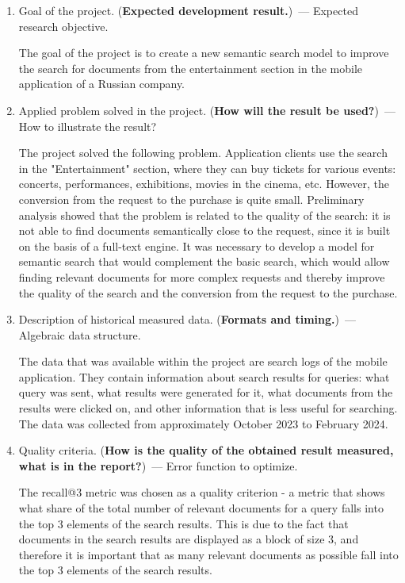 \documentclass[12pt]{article}
\begin{document}
\begin{enumerate}
\item Goal of the project. (\textbf{Expected development result.})~---
Expected research objective.  

The goal of the project is to create a new semantic search model to improve the search for documents from the entertainment section in the mobile application of a Russian company.  

\item Applied problem solved in the project. (\textbf{How will the result be used?})~--- How to illustrate the result?  

The project solved the following problem. Application clients use the search in the "Entertainment" section, where they can buy tickets for various events: concerts, performances, exhibitions, movies in the cinema, etc. However, the conversion from the request to the purchase is quite small. Preliminary analysis showed that the problem is related to the quality of the search: it is not able to find documents semantically close to the request, since it is built on the basis of a full-text engine. It was necessary to develop a model for semantic search that would complement the basic search, which would allow finding relevant documents for more complex requests and thereby improve the quality of the search and the conversion from the request to the purchase.  

\item Description of historical measured data. (\textbf{Formats and timing.})~--- Algebraic data structure.  

The data that was available within the project are search logs of the mobile application. They contain information about search results for queries: what query was sent, what results were generated for it, what documents from the results were clicked on, and other information that is less useful for searching. The data was collected from approximately October 2023 to February 2024.

\item Quality criteria. (\textbf{How is the quality of the obtained result measured, what is in the report?})~--- Error function to optimize.  

The recall@3 metric was chosen as a quality criterion - a metric that shows what share of the total number of relevant documents for a query falls into the top 3 elements of the search results. This is due to the fact that documents in the search results are displayed as a block of size 3, and therefore it is important that as many relevant documents as possible fall into the top 3 elements of the search results.  


\end{enumerate}
\end{document}
